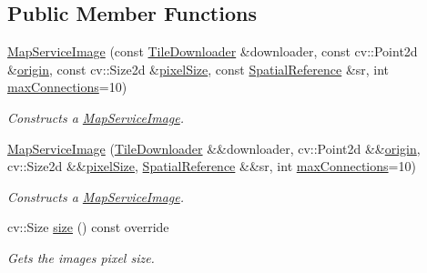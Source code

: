\subsection*{Public Member Functions}
\begin{DoxyCompactItemize}
\item 
\hyperlink{group___imagery_module_gacf8dbc680dc88bda0c9b8f289b659be4}{Map\+Service\+Image} (const \hyperlink{structdg_1_1deepcore_1_1imagery_1_1_tile_downloader}{Tile\+Downloader} \&downloader, const cv\+::\+Point2d \&\hyperlink{classdg_1_1deepcore_1_1imagery_1_1_map_service_image_a60100be52a03f32adb25eb8237cd3836}{origin}, const cv\+::\+Size2d \&\hyperlink{classdg_1_1deepcore_1_1imagery_1_1_map_service_image_a0bb95ccc2ad0160d8e2e1a248c26a51e}{pixel\+Size}, const \hyperlink{classdg_1_1deepcore_1_1imagery_1_1_spatial_reference}{Spatial\+Reference} \&sr, int \hyperlink{group___imagery_module_ga1774c7d4c06c8e18a98db65b088b19b9}{max\+Connections}=10)
\begin{DoxyCompactList}\small\item\em Constructs a \hyperlink{classdg_1_1deepcore_1_1imagery_1_1_map_service_image}{Map\+Service\+Image}. \end{DoxyCompactList}\item 
\hyperlink{group___imagery_module_gab2e2d296871f5372c45b2c4f55a9120c}{Map\+Service\+Image} (\hyperlink{structdg_1_1deepcore_1_1imagery_1_1_tile_downloader}{Tile\+Downloader} \&\&downloader, cv\+::\+Point2d \&\&\hyperlink{classdg_1_1deepcore_1_1imagery_1_1_map_service_image_a60100be52a03f32adb25eb8237cd3836}{origin}, cv\+::\+Size2d \&\&\hyperlink{classdg_1_1deepcore_1_1imagery_1_1_map_service_image_a0bb95ccc2ad0160d8e2e1a248c26a51e}{pixel\+Size}, \hyperlink{classdg_1_1deepcore_1_1imagery_1_1_spatial_reference}{Spatial\+Reference} \&\&sr, int \hyperlink{group___imagery_module_ga1774c7d4c06c8e18a98db65b088b19b9}{max\+Connections}=10)
\begin{DoxyCompactList}\small\item\em Constructs a \hyperlink{classdg_1_1deepcore_1_1imagery_1_1_map_service_image}{Map\+Service\+Image}. \end{DoxyCompactList}\item 
cv\+::\+Size \hyperlink{classdg_1_1deepcore_1_1imagery_1_1_map_service_image_a1e27b85df43101633e27fd4ee38dd979}{size} () const override
\begin{DoxyCompactList}\small\item\em Gets the image\textquotesingle{}s pixel size. \end{DoxyCompactList}\item 

\end{DoxyCompactItemize}
